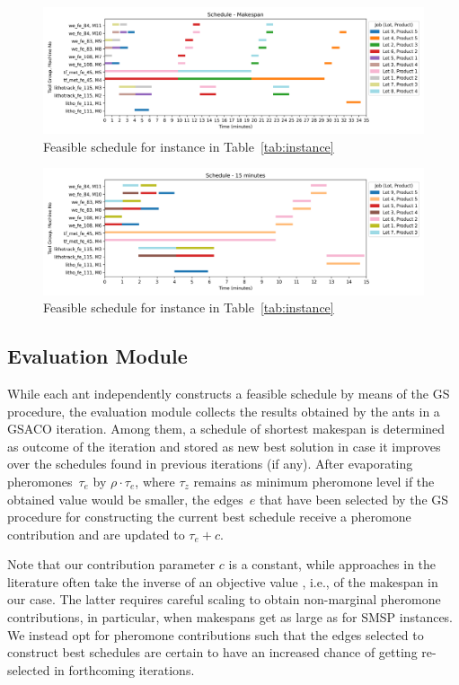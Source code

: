 \begin{figure}[ht]
	\includegraphics[width=\textwidth]{schedule_example_makespan.png}
	\caption{Feasible schedule for instance in Table~\ref{tab:instance}}
	\label{fig:sch-makespan}
\end{figure}
\begin{figure}[ht]
	\includegraphics[width=\textwidth]{schedule_example_operations.png}
	\caption{Feasible schedule for instance in Table~\ref{tab:instance}}
	\label{fig:sch-operations}
\end{figure}


\subsection{Evaluation Module}
While each ant independently constructs a feasible schedule by means of the
GS procedure, the evaluation module collects the results obtained
by the ants in a GSACO iteration.
Among them, a schedule of shortest makespan is determined as outcome of the
iteration and stored as new best solution in case it improves over the schedules found in previous iterations (if any).
After evaporating pheromones~$\tau_e$ by $\rho\cdot\tau_e$,
where $\tau_z$ remains as minimum pheromone level if the obtained value
would be smaller,
the edges~$e$ that have been selected by the GS procedure for constructing the current best schedule receive a pheromone contribution and are updated to $\tau_e+c$.

Note that our contribution parameter $c$ is a constant,
while approaches in the literature often take the inverse of an objective value
\cite{turkyilmaz2020research}, i.e., of the makespan in our case.
The latter requires careful scaling to obtain non-marginal
pheromone contributions, in particular, when makespans get as large
as for SMSP instances.
We instead opt for pheromone contributions such that the
edges selected to construct best schedules are certain to have an increased chance
of getting re-selected in forthcoming iterations.

